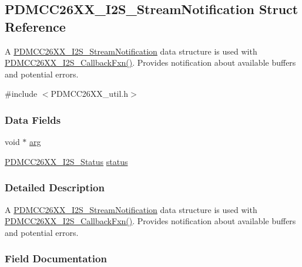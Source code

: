 \subsection{P\+D\+M\+C\+C26\+X\+X\+\_\+\+I2\+S\+\_\+\+Stream\+Notification Struct Reference}
\label{struct_p_d_m_c_c26_x_x___i2_s___stream_notification}


A \hyperlink{struct_p_d_m_c_c26_x_x___i2_s___stream_notification}{P\+D\+M\+C\+C26\+X\+X\+\_\+\+I2\+S\+\_\+\+Stream\+Notification} data structure is used with \hyperlink{_p_d_m_c_c26_x_x__util_8h_a82786f08d1b22895c79dcd8880fb92f3}{P\+D\+M\+C\+C26\+X\+X\+\_\+\+I2\+S\+\_\+\+Callback\+Fxn()}. Provides notification about available buffers and potential errors.  




{\ttfamily \#include $<$P\+D\+M\+C\+C26\+X\+X\+\_\+util.\+h$>$}

\subsubsection*{Data Fields}
\begin{DoxyCompactItemize}
\item 
void $\ast$ \hyperlink{struct_p_d_m_c_c26_x_x___i2_s___stream_notification_a1801d35678740cfd40b4204b66b134e0}{arg}
\item 
\hyperlink{_p_d_m_c_c26_x_x__util_8h_ac1e4fbeb33409a874015d4e0609ddff1}{P\+D\+M\+C\+C26\+X\+X\+\_\+\+I2\+S\+\_\+\+Status} \hyperlink{struct_p_d_m_c_c26_x_x___i2_s___stream_notification_a0299d59c398531b389196e260548ad30}{status}
\end{DoxyCompactItemize}


\subsubsection{Detailed Description}
A \hyperlink{struct_p_d_m_c_c26_x_x___i2_s___stream_notification}{P\+D\+M\+C\+C26\+X\+X\+\_\+\+I2\+S\+\_\+\+Stream\+Notification} data structure is used with \hyperlink{_p_d_m_c_c26_x_x__util_8h_a82786f08d1b22895c79dcd8880fb92f3}{P\+D\+M\+C\+C26\+X\+X\+\_\+\+I2\+S\+\_\+\+Callback\+Fxn()}. Provides notification about available buffers and potential errors. 

\subsubsection{Field Documentation}
